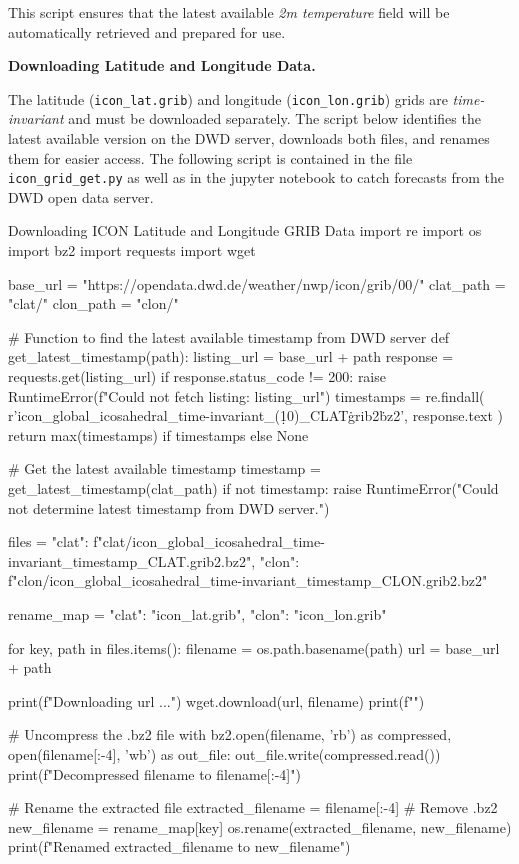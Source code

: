 This script ensures that the latest available \emph{2m temperature} field will be automatically retrieved and prepared for use.

{\bf Downloading Latitude and Longitude Data.} 

The latitude (\texttt{icon\_lat.grib}) and longitude (\texttt{icon\_lon.grib}) grids are \emph{time-invariant} and must be downloaded separately. The script below identifies the latest available version on the DWD server, downloads both files, and renames them for easier access. The following script is contained in the file \texttt{icon\_grid\_get.py} as well as in the jupyter notebook to catch forecasts from the DWD open data server. 

\begin{codeonly}{Downloading ICON Latitude and Longitude GRIB Data}
import re
import os
import bz2
import requests
import wget

base_url = "https://opendata.dwd.de/weather/nwp/icon/grib/00/"
clat_path = "clat/"
clon_path = "clon/"

# Function to find the latest available timestamp from DWD server
def get_latest_timestamp(path):
    listing_url = base_url + path
    response = requests.get(listing_url)
    if response.status_code != 200:
        raise RuntimeError(f"Could not fetch listing: {listing_url}")
    timestamps = re.findall(
        r'icon_global_icosahedral_time-invariant_(\d{10})_CLAT\.grib2\.bz2',
        response.text
    )
    return max(timestamps) if timestamps else None

# Get the latest available timestamp
timestamp = get_latest_timestamp(clat_path)
if not timestamp:
    raise RuntimeError("Could not determine latest timestamp from DWD server.")

files = {
    "clat": f"clat/icon_global_icosahedral_time-invariant_{timestamp}_CLAT.grib2.bz2",
    "clon": f"clon/icon_global_icosahedral_time-invariant_{timestamp}_CLON.grib2.bz2"
}

rename_map = {"clat": "icon_lat.grib", "clon": "icon_lon.grib"}

for key, path in files.items():
    filename = os.path.basename(path)
    url = base_url + path

    print(f"Downloading {url} ...")
    wget.download(url, filename)
    print(f"")

    # Uncompress the .bz2 file
    with bz2.open(filename, 'rb') as compressed, open(filename[:-4], 'wb') as out_file:
        out_file.write(compressed.read())
    print(f"Decompressed {filename} to {filename[:-4]}")

    # Rename the extracted file
    extracted_filename = filename[:-4]  # Remove .bz2
    new_filename = rename_map[key]
    os.rename(extracted_filename, new_filename)
    print(f"Renamed {extracted_filename} to {new_filename}")
\end{codeonly}

